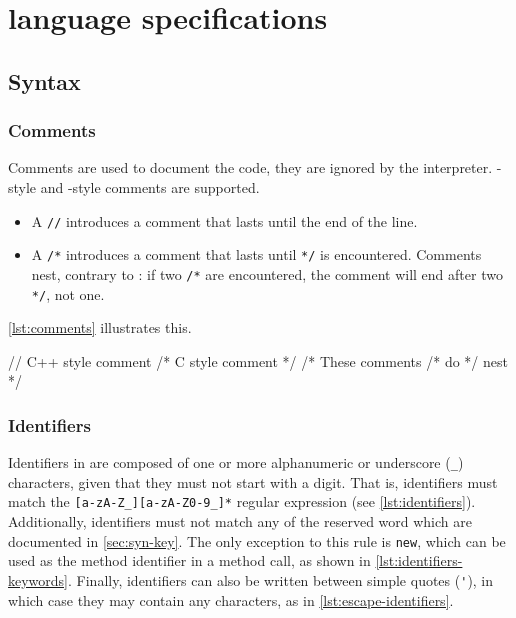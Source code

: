 \chapter{\us language specifications}
\label{sec:lang}

\section{Syntax}
\subsection{Comments}

Comments are used to document the code, they are ignored by the
\us interpreter. \Cxx-style and \C-style comments are supported.

\begin{itemize}
\item A \lstinline|//| introduces a comment that lasts until the end
  of the line.
\item A \lstinline|/*| introduces a comment that lasts until
  \lstinline|*/| is encountered. Comments nest, contrary to \C:
  if two \lstinline|/*| are encountered, the
  comment will end after two \lstinline|*/|, not one.
\end{itemize}

\autoref{lst:comments} illustrates this.

\begin{urbiscript}[caption=Comments,label=lst:comments,float=\floatpos]
// C++ style comment
/* C style comment */
/* These comments /* do */ nest */
\end{urbiscript}

\subsection{Identifiers}
\label{sec:us-syn-id}

Identifiers in \us are composed of one or more alphanumeric or
underscore (\lstinline|_|) characters, given that they must not start
with a digit. That is, identifiers must match the
\lstinline|[a-zA-Z_][a-zA-Z0-9_]*| regular expression (see
\autoref{lst:identifiers}).  Additionally, identifiers must not match any of
the \us reserved word which are documented in \autoref{sec:syn-key}. The only
exception to this rule is \lstinline|new|, which can be used as the
method identifier in a method call, as shown in
\autoref{lst:identifiers-keywords}.  Finally, identifiers can also be written
between simple quotes (\lstinline|'|), in which case they may contain
any characters, as in \autoref{lst:escape-identifiers}.

